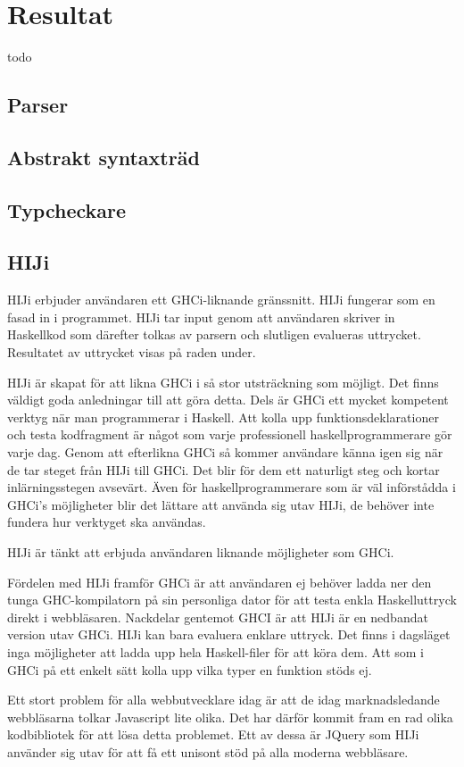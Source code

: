 \section{Resultat}
todo

\subsection{Parser} 

\subsection{Abstrakt syntaxträd} 

\subsection{Typcheckare} 


\subsection{HIJi}


HIJi erbjuder användaren ett GHCi-liknande gränssnitt. HIJi fungerar som en fasad in i programmet. 
HIJi tar input genom att användaren skriver in Haskellkod som därefter tolkas av parsern och slutligen evalueras uttrycket. Resultatet av uttrycket visas på raden under.

HIJi är skapat för att likna GHCi i så stor utsträckning som möjligt. Det finns väldigt goda anledningar till att göra detta. Dels är GHCi ett mycket kompetent verktyg när man programmerar i Haskell. Att kolla upp funktionsdeklarationer och testa kodfragment är något som varje professionell haskellprogrammerare gör varje dag. Genom att efterlikna GHCi så kommer användare känna igen sig när de tar steget från HIJi till GHCi. Det blir för dem ett naturligt steg och kortar inlärningsstegen avsevärt. Även för haskellprogrammerare som är väl införstådda i GHCi's möjligheter blir det lättare att använda sig utav HIJi, de behöver inte fundera hur verktyget ska användas.




HIJi är tänkt att erbjuda användaren liknande möjligheter som GHCi. 

Fördelen med HIJi framför GHCi är att användaren ej behöver ladda ner den tunga GHC-kompilatorn på sin personliga dator för att testa enkla Haskelluttryck direkt i webbläsaren.
Nackdelar gentemot GHCI är att HIJi är en nedbandat version utav GHCi. HIJi kan bara evaluera enklare uttryck. Det finns i dagsläget inga möjligheter att ladda upp hela Haskell-filer för att köra dem. Att som i GHCi på ett enkelt sätt kolla upp vilka typer en funktion stöds ej.

Ett stort problem för alla webbutvecklare idag är att de idag marknadsledande webbläsarna tolkar Javascript lite olika. Det har därför kommit fram en rad olika kodbibliotek för att lösa detta problemet. Ett av dessa är JQuery som HIJi använder sig utav för att få ett unisont stöd på alla moderna webbläsare. 


